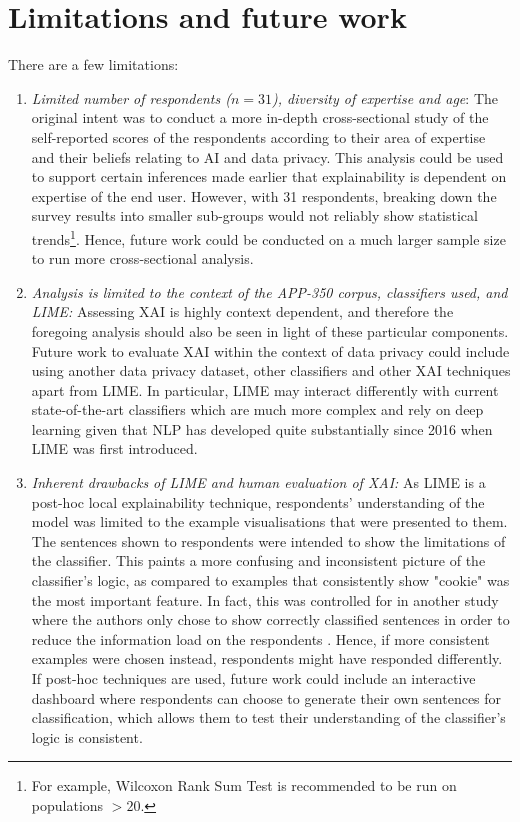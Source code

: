 \section{Limitations and future work}
There are a few limitations:
\begin{enumerate}
    \item \textit{Limited number of respondents ($n = 31$), diversity of expertise and age}: The original intent was to conduct a more in-depth cross-sectional study of the self-reported scores of the respondents according to their area of expertise and their beliefs relating to AI and data privacy. This analysis could be used to support certain inferences made earlier that explainability is dependent on expertise of the end user. However, with 31 respondents, breaking down the survey results into smaller sub-groups would not reliably show statistical trends\footnote{For example, Wilcoxon Rank Sum Test is recommended to be run on populations $> 20$.}. Hence, future work could be conducted on a much larger sample size to run more cross-sectional analysis.
    
    \item \textit{Analysis is limited to the context of the APP-350 corpus, classifiers used, and LIME:} Assessing XAI is highly context dependent, and therefore the foregoing analysis should also be seen in light of these particular components. Future work to evaluate XAI within the context of data privacy could include using another data privacy dataset, other classifiers and other XAI techniques apart from LIME. In particular, LIME may interact differently with current state-of-the-art classifiers which are much more complex and rely on deep learning given that NLP has developed quite substantially since 2016 when LIME was first introduced.
    
    \item \textit{Inherent drawbacks of LIME and human evaluation of XAI:} As LIME is a post-hoc local explainability technique, respondents' understanding of the model was limited to the example visualisations that were presented to them. The sentences shown to respondents were intended to show the limitations of the classifier. This paints a more confusing and inconsistent picture of the classifier's logic, as compared to examples that consistently show "cookie" was the most important feature. In fact, this was controlled for in another study where the authors only chose to show correctly classified sentences in order to reduce the information load on the respondents \cite{gorski2021}. Hence, if more consistent examples were chosen instead, respondents might have responded differently. If post-hoc techniques are used, future work could include an interactive dashboard where respondents can choose to generate their own sentences for classification, which allows them to test their understanding of the classifier's logic is consistent.
    

\end{enumerate}
